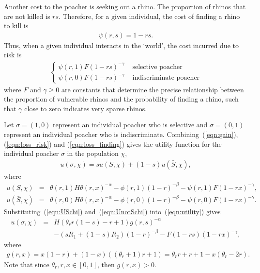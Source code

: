 \documentclass[10pt]{article}
\begin{document}
Another cost to the poacher is seeking out a rhino. The proportion of rhinos that are not killed is $rs$. Therefore, for a given individual, the cost of finding a rhino to kill is 
\begin{eqnarray}
\label{eqn:psi}
\psi(r,s) = 1-rs.
\end{eqnarray} 
Thus, when a given individual interacts in the `world', the cost incurred due to risk is
\begin{eqnarray}
\label{eqn:loss_finding}
\left\{
\begin{array}{cl}
\psi(r,1) F(1-rs)^{-\gamma} & \mbox{ selective poacher}
\\
\psi(r,0) F(1-rs)^{-\gamma} & \mbox{ indiscriminate poacher}
\end{array} \right.
\end{eqnarray}
where $F$ and $\gamma \geq 0$ are constants that determine the precise relationship between the proportion of vulnerable rhinos and the probability of finding a rhino, such that $\gamma$ close to zero indicates very sparse rhinos. 

Let  $\sigma = (1,0)$ represent an individual poacher who is selective and $\sigma = (0,1)$ represent an individual poacher who is indiscriminate. Combining~(\ref{eqn:gain}), (\ref{eqn:loss_risk}) and (\ref{eqn:loss_finding}) gives the utility function for the individual poacher $\sigma$ in the population $\chi$, 
\begin{eqnarray}
\label{eqn:utility}
u(\sigma, \chi) = s u(S,\chi) +(1-s) u(\bar{S},\chi), 
\end{eqnarray}
where
\begin{eqnarray}
\label{eqn:USchi}
u(S,\chi) &=& \theta(r,1) H \theta(r,x)^{-\alpha}
- \phi(r,1) (1-r)^{-\beta} 
- \psi(r,1) F(1-rx)^{-\gamma} ,
\\
\label{eqn:UnotSchi}
u(\bar{S},\chi) &=& \theta(r,0) H \theta(r,x)^{-\alpha}
- \phi(r,0) (1-r)^{-\beta}
- \psi(r,0) F(1-rx)^{-\gamma}.
\end{eqnarray}
Substituting~(\ref{eqn:USchi}) and~(\ref{eqn:UnotSchi}) into~(\ref{eqn:utility}) gives
\begin{eqnarray}
\label{eqn:utility2}
u(\sigma, \chi) &=& 
H (\theta_r r(1-s) - r + 1)g(r,s)^{-\alpha} \\ \nonumber &&
-
(sR_1 + (1-s)R_2)(1-r)^{-\beta} - F(1-rs)(1-rx)^{-\gamma},
\end{eqnarray}
where 
\begin{eqnarray}
\label{eqn:g}
g(r,x) = x(1-r)+(1-x)((\theta_r+1)r+1) = \theta_r r + r + 1 - x(\theta_r - 2r).
\end{eqnarray}
Note that since $\theta_r, r, x  \in [0,1]$, then $g(r,x)>0$.
\end{document}
